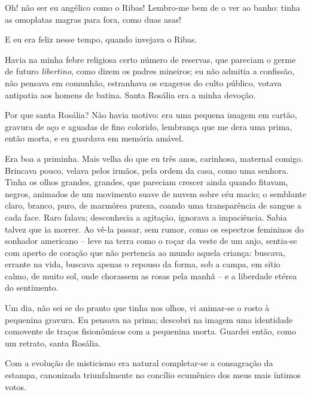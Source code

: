 Oh! não ser eu angélico como o Ribas! Lembro{}-me
bem de o ver ao banho: tinha as omoplatas magras para fora, 
como duas asas! 

E eu era feliz nesse tempo, quando invejava o Ribas. 

Havia na minha febre religiosa certo número de reservas, que pareciam o germe de
futuro \textit{libertino}, como dizem os padres mineiros; eu não admitia a
confissão, não pensava em comunhão, estranhava os exageros do culto
público, votava antipatia aos homens de batina. Santa Rosália era a
minha devoção. 

Por que santa Rosália? Não havia motivo: era uma pequena
imagem em cartão, gravura de aço e aguadas de fino colorido, lembrança
que me dera uma prima, então morta, e eu guardava em memória amável.

Era boa a priminha. Mais velha do que eu três anos, carinhosa, maternal
comigo. Brincava pouco, velava pelos irmãos, pela ordem da casa, como
uma senhora. Tinha os olhos grandes, grandes, que pareciam crescer
ainda quando fitavam, negros, animados de um movimento suave de nuvem
sobre céu macio; o semblante claro, branco, puro, de marmórea pureza,
coando uma transparência de sangue a cada face. Raro falava;
desconhecia a agitação, ignorava a impaciência. Sabia talvez que ia
morrer. Ao vê{}-la passar, sem rumor, como os espectros femininos do
sonhador americano -- leve na terra como o roçar da veste de um anjo,
sentia{}-se com aperto de coração que não pertencia ao mundo aquela
criança: buscava, errante na vida, buscava apenas o repouso da forma,
sob a campa, em sítio calmo, de muito sol, onde chorassem as rosas pela
manhã -- e a liberdade etérea do sentimento. 

Um dia, não sei se do
pranto que tinha nos olhos, vi animar{}-se o rosto à pequenina gravura.
Eu pensava na prima; descobri na imagem uma identidade comovente de
traços fisionômicos com a pequenina morta. Guardei então, como um
retrato, santa Rosália. 

Com a evolução de misticismo era natural
completar{}-se a consagração da estampa, canonizada triunfalmente no
concílio ecumênico dos meus mais íntimos votos.

